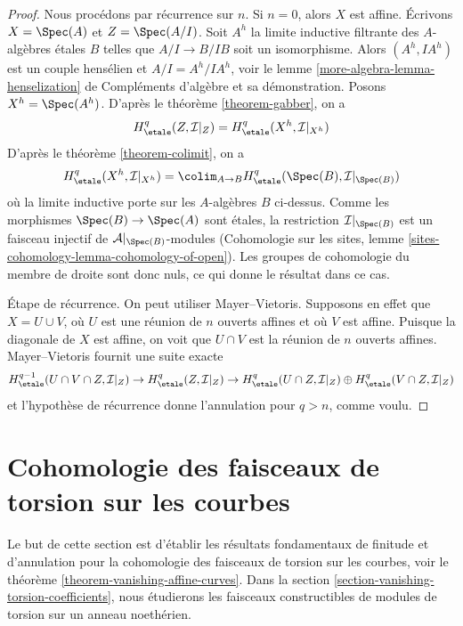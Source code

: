 \begin{proof}
Nous procédons par récurrence sur $n$. Si $n = 0$, alors $X$ est affine.
Écrivons $X = \Spec(A)$ et $Z = \Spec(A/I)$. Soit $A^h$ la limite inductive filtrante
des $A$-algèbres étales $B$ telles que $A/I \to B/IB$ soit un isomorphisme.
Alors $(A^h, IA^h)$ est un couple hensélien et $A/I = A^h/IA^h$, voir
le lemme \ref{more-algebra-lemma-henselization} de Compléments d'algèbre
et sa démonstration. Posons $X^h = \Spec(A^h)$.
D'après le théorème \ref{theorem-gabber},
on a
$$
H^q_\etale(Z, \mathcal{I}|_Z) = H^q_\etale(X^h, \mathcal{I}|_{X^h})
$$
D'après le théorème \ref{theorem-colimit}, on a
$$
H^q_\etale(X^h, \mathcal{I}|_{X^h}) =
\colim_{A \to B} H^q_\etale(\Spec(B), \mathcal{I}|_{\Spec(B)})
$$
où la limite inductive porte sur les $A$-algèbres $B$ ci-dessus.
Comme les morphismes $\Spec(B) \to \Spec(A)$ sont étales,
la restriction $\mathcal{I}|_{\Spec(B)}$ est un faisceau injectif
de $\mathcal{A}|_{\Spec(B)}$-modules
(Cohomologie sur les sites, lemme \ref{sites-cohomology-lemma-cohomology-of-open}).
Les groupes de cohomologie du membre de droite sont donc nuls, ce qui donne le
résultat dans ce cas.

\medskip\noindent
Étape de récurrence. On peut utiliser Mayer--Vietoris.
Supposons en effet que $X = U \cup V$, où $U$ est une réunion de $n$ ouverts
affines et où $V$ est affine. Puisque la diagonale de $X$ est affine,
on voit que $U \cap V$ est la réunion de $n$ ouverts affines. Mayer--Vietoris
fournit une suite exacte
$$
H^{q - 1}_\etale(U \cap V \cap Z, \mathcal{I}|_Z) \to
H^q_\etale(Z, \mathcal{I}|_Z) \to
H^q_\etale(U \cap Z, \mathcal{I}|_Z) \oplus
H^q_\etale(V \cap Z, \mathcal{I}|_Z)
$$
et l'hypothèse de récurrence donne l'annulation pour $q > n$, comme voulu.
\end{proof}





\section{Cohomologie des faisceaux de torsion sur les courbes}
\label{section-vanishing-torsion}

\noindent
Le but de cette section est d'établir les résultats fondamentaux de finitude et d'annulation
pour la cohomologie des faisceaux de torsion sur les courbes, voir le
théorème \ref{theorem-vanishing-affine-curves}.
Dans la section \ref{section-vanishing-torsion-coefficients},
nous étudierons les faisceaux constructibles de modules de torsion
sur un anneau noethérien.

